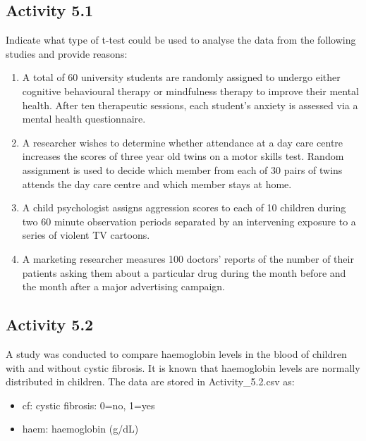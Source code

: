 \documentclass[
  a4paper,
]{memoir}
\providecommand{\tightlist}{%
  \setlength{\itemsep}{0pt}\setlength{\parskip}{0pt}}
\begin{document}

\subsection*{Activity 5.1}\label{activity-5.1}

Indicate what type of t-test could be used to analyse the data from the
following studies and provide reasons:

\begin{enumerate}
\def\labelenumi{\alph{enumi})}
\tightlist
\item
  A total of 60 university students are randomly assigned to undergo
  either cognitive behavioural therapy or mindfulness therapy to improve
  their mental health. After ten therapeutic sessions, each student's
  anxiety is assessed via a mental health questionnaire.
\item
  A researcher wishes to determine whether attendance at a day care
  centre increases the scores of three year old twins on a motor skills
  test. Random assignment is used to decide which member from each of 30
  pairs of twins attends the day care centre and which member stays at
  home.
\item
  A child psychologist assigns aggression scores to each of 10 children
  during two 60 minute observation periods separated by an intervening
  exposure to a series of violent TV cartoons.
\item
  A marketing researcher measures 100 doctors' reports of the number of
  their patients asking them about a particular drug during the month
  before and the month after a major advertising campaign.
\end{enumerate}

\subsection*{Activity 5.2}\label{activity-5.2}

A study was conducted to compare haemoglobin levels in the blood of
children with and without cystic fibrosis. It is known that haemoglobin
levels are normally distributed in children. The data are stored in
Activity\_5.2.csv as:

\begin{itemize}
\tightlist
\item
  cf: cystic fibrosis: 0=no, 1=yes
\item
  haem: haemoglobin (g/dL)
\end{itemize}
\end{document}
